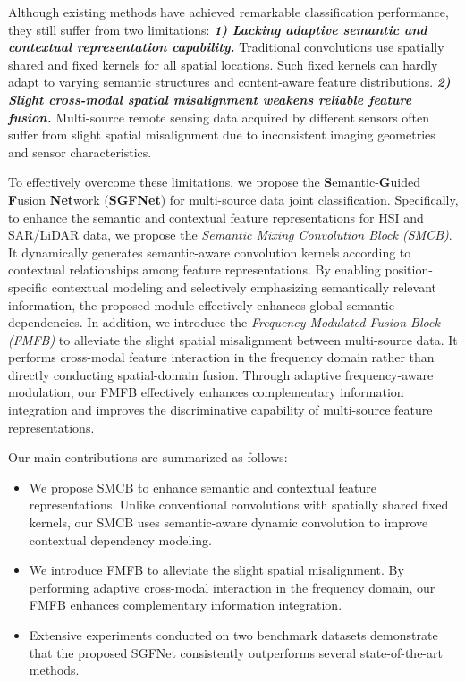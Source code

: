Although existing methods have achieved remarkable classification performance, they still suffer from two limitations: \emph{\textbf{1) Lacking adaptive semantic and contextual representation capability.}} Traditional convolutions use spatially shared and fixed kernels for all spatial locations. Such fixed kernels can hardly adapt to varying semantic structures and content-aware feature distributions. \emph{\textbf{2) Slight cross-modal spatial misalignment weakens reliable feature fusion.}} Multi-source remote sensing data acquired by different sensors often suffer from slight spatial misalignment due to inconsistent imaging geometries and sensor characteristics. 

To effectively overcome these limitations, we propose the \textbf{S}emantic-\textbf{G}uided \textbf{F}usion \textbf{Net}work (\textbf{SGFNet}) for multi-source data joint classification. Specifically, to enhance the semantic and contextual feature representations for HSI and SAR/LiDAR data, we propose the \textit{Semantic Mixing Convolution Block (SMCB)}. It dynamically generates semantic-aware convolution kernels according to contextual relationships among feature representations. By enabling position-specific contextual modeling and selectively emphasizing semantically relevant information, the proposed module effectively enhances global semantic dependencies. In addition, we introduce the \textit{Frequency Modulated Fusion Block (FMFB)} to alleviate the slight spatial misalignment between multi-source data. It performs cross-modal feature interaction in the frequency domain rather than directly conducting spatial-domain fusion. Through adaptive frequency-aware modulation, our FMFB effectively enhances complementary information integration and improves the discriminative capability of multi-source feature representations.

Our main contributions are summarized as follows:

\begin{itemize}
  \item We propose SMCB to enhance semantic and contextual feature representations. Unlike conventional convolutions with spatially shared fixed kernels, our SMCB uses semantic-aware dynamic convolution to improve contextual dependency modeling.

  \item We introduce FMFB to alleviate the slight spatial misalignment. By performing adaptive cross-modal interaction in the frequency domain, our FMFB enhances complementary information integration. 
  
  \item Extensive experiments conducted on two benchmark datasets demonstrate that the proposed SGFNet consistently outperforms several state-of-the-art methods.
\end{itemize}
